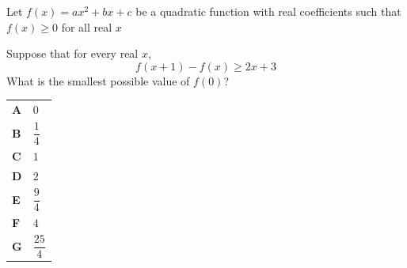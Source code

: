 \documentclass[11pt,a4paper]{article}
\begin{document}
\clearpage
\thispagestyle{djspaper}
\vspace*{8pt}
\begin{enumerate}[label=\textbf{\arabic*.},leftmargin=*,itemsep=0pt,start=20]
\questionitem[Inequalities]
Let $f(x)=ax^2+bx+c$ be a quadratic function with real coefficients such that $f(x)\ge 0$ for all real $x$

Suppose that for every real $x$, \[ f(x+1)-f(x)\ge 2x+3 \] What is the smallest possible value of $f(0)$?

\par\vspace*{12pt}
\begin{tabularx}{\linewidth}{@{}>{\bfseries}l Y@{}}
A &
$0$
\\[0.8em]
B &
$\dfrac{1}{4}$
\\[0.8em]
C &
$1$
\\[0.8em]
D &
$2$
\\[0.8em]
E &
$\dfrac{9}{4}$
\\[0.8em]
F &
$4$
\\[0.8em]
G &
$\dfrac{25}{4}$
\\
\end{tabularx}
\end{enumerate}
\end{document}
